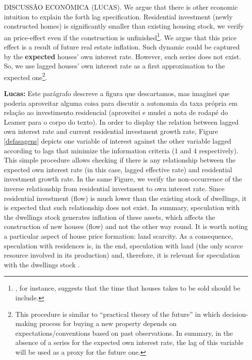 \documentclass[12pt, a4paper]{article}
\begin{document}
DISCUSSÃO ECONÔMICA (LUCAS).
We argue that there is other economic intuition to explain the forth lag specification.
Residential investment (newly constructed homes) is significantly smaller than existing housing stock, we verify an price-effect even if the construction is unfinished\footnote{\textcite{poterba_tax_1984}, for instance, suggests that the time that houses takes to be sold should be include.}.
We argue that this price effect is a result of future real estate inflation.
Such dynamic could be captured by the \textbf{expected} houses' own interest rate.
However, such series does not exist.
So, we use lagged houses' own interest rate as a first approximation to the expected one\footnote{This procedure is similar to \textcite{keynes_general_1937} ``practical theory of the future'' in which decision-making process for buying a new property depends on expectations/conventions based on past observations.
In summary, in the absence of a series for the expected own interest rate, the lag of this variable will be used as a proxy for the future one.}.

\textbf{Lucas:} Este parágrafo descreve a figura que descartamos, mas imaginei que poderia aproveitar alguma coisa para discutir a autonomia da taxa própria em relação ao investimento residencial (aproveitei e mudei a nota de rodapé do Leamer para o corpo do texto).
In order to display the relation between lagged own interest rate and current residential investment growth rate, Figure \ref{defasagens} depicts one variable of interest against the other variable lagged according to lags that minimize the information criteria (1 and 4 respectively).
This simple procedure allows checking if there is any relationship between the expected own interest rate (in this case, lagged effective rate) and residential investment growth rate.
In the same Figure, we verify the non-occurrence of the inverse relationship from residential investment to own interest rate.
Since residential investment (flow) is much lower than the existing stock of dwellings, it is expected that such relationship does not exist.
In summary, speculation with the dwellings stock generates inflation of these assets, which affects the construction of new houses (flow) and not the other way round.
It is worth noting a particular aspect of house price formation: land scarcity. As a consequence, speculation with residences is, in the end, speculation with land (the only scarce resource involved in its production) and, therefore, it is relevant for speculation with the dwellings stock \cite[p.~349]{leamer_housing_2007}.
\end{document}

